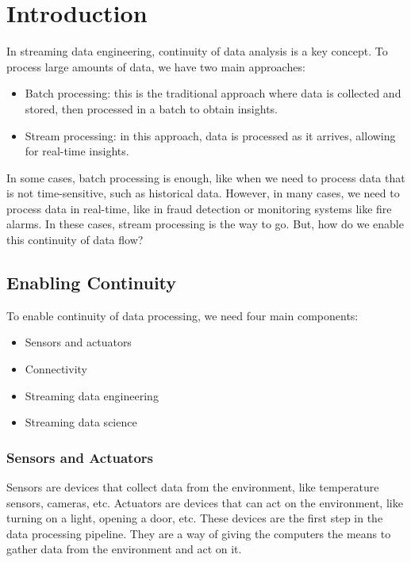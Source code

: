 \chapter{Introduction}

In streaming data engineering, continuity of data analysis is a key concept. To process
large amounts of data, we have two main approaches:

\begin{itemize}
    \item Batch processing: this is the traditional approach where data is collected and stored, 
    then processed in a batch to obtain insights.
    \item Stream processing: in this approach, data is processed as it arrives, allowing for real-time
    insights.
\end{itemize}

In some cases, batch processing is enough, like when we need to process data that is not time-sensitive, such
as historical data. However, in many cases, we need to process data in real-time, like in fraud detection or
monitoring systems like fire alarms. In these cases, stream processing is the way to go. But, how do 
we enable this continuity of data flow?

\section{Enabling Continuity}

To enable continuity of data processing, we need four main components:

\begin{itemize}
    \item Sensors and actuators
    \item Connectivity
    \item Streaming data engineering
    \item Streaming data science
\end{itemize}

\subsection{Sensors and Actuators}

Sensors are devices that collect data from the environment, like temperature sensors, cameras, etc. Actuators
are devices that can act on the environment, like turning on a light, opening a door, etc. These devices
are the first step in the data processing pipeline. They are a way of giving the computers the means to gather 
data from the environment and act on it.\\

